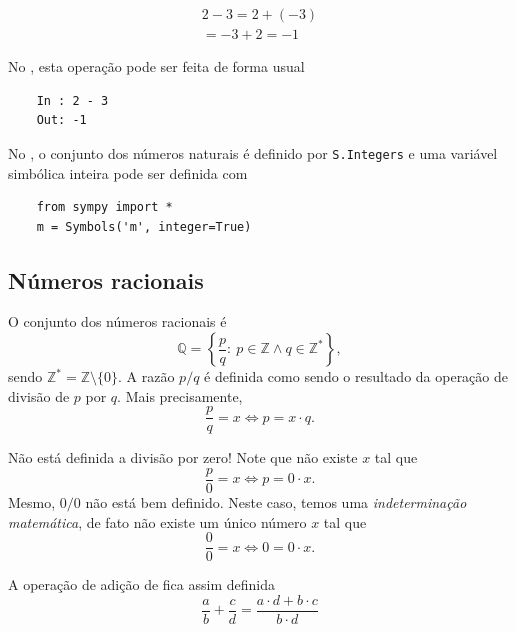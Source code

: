 \begin{ex}
  \begin{gather}
    2 - 3 = 2 + (-3) \\
    = -3 + 2 = -1
  \end{gather}

  \ifispython
  No \python, esta operação pode ser feita de forma usual
  \begin{lstlisting}
    In : 2 - 3
    Out: -1
  \end{lstlisting}
  \fi
\end{ex}

\ifispython
\begin{obs}
  No \sympy, o conjunto dos números naturais é definido por \lstinline!S.Integers! e uma variável simbólica inteira pode ser definida com
  \begin{lstlisting}
    from sympy import *
    m = Symbols('m', integer=True)
  \end{lstlisting}
\end{obs}
\fi

\subsection{Números racionais}

O conjunto dos números racionais é
\begin{equation}
  \mathbb{Q} = \left\{\frac{p}{q}:~p\in\mathbb{Z}\land q\in\mathbb{Z}^*\right\},
\end{equation}
sendo $\mathbb{Z}^*=\mathbb{Z}\setminus\{0\}$. A razão $p/q$ é definida como sendo o resultado da operação de divisão de $p$ por $q$. Mais precisamente,
\begin{equation}
  \frac{p}{q} = x \Leftrightarrow p = x\cdot q.
\end{equation}

\begin{obs}
  Não está definida a divisão por zero! Note que não existe $x$ tal que
  \begin{equation}
    \frac{p}{0} = x \Leftrightarrow p = 0\cdot x.
  \end{equation}
  Mesmo, $0/0$ não está bem definido. Neste caso, temos uma \emph{indeterminação matemática}, de fato não existe um único número $x$ tal que
  \begin{equation}
    \frac{0}{0} = x \Leftrightarrow 0 = 0\cdot x.
  \end{equation}
\end{obs}

A operação de adição de fica assim definida
\begin{equation}
  \frac{a}{b} + \frac{c}{d} = \frac{a\cdot d + b\cdot c}{b\cdot d}
\end{equation}

